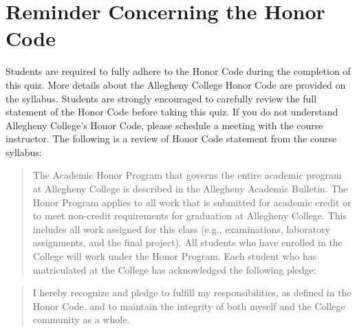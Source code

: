 \documentclass[11pt]{article}
\begin{document}
\section*{Reminder Concerning the Honor Code}

\noindent Students are required to fully adhere to the Honor Code during the
completion of this quiz. More details about the Allegheny College Honor Code are
provided on the syllabus. Students are strongly encouraged to carefully review
the full statement of the Honor Code before taking this quiz. If you do not
understand Allegheny College's Honor Code, please schedule a meeting with the
course instructor. The following is a review of Honor Code statement from the
course syllabus:

\begin{quote}

  The Academic Honor Program that governs the entire academic program at
  Allegheny College is described in the Allegheny Academic Bulletin. The Honor
  Program applies to all work that is submitted for academic credit or to meet
  non-credit requirements for graduation at Allegheny College. This includes all
  work assigned for this class (e.g., examinations, laboratory assignments, and
  the final project). All students who have enrolled in the College will work
  under the Honor Program. Each student who has matriculated at the College has
  acknowledged the following pledge:

\end{quote}

\begin{quote}

  I hereby recognize and pledge to fulfill my responsibilities, as defined in the Honor Code, and to maintain the
  integrity of both myself and the College community as a whole.

\end{quote}
\end{document}
